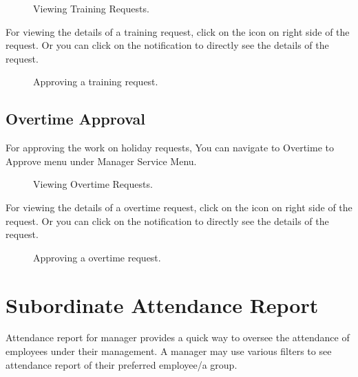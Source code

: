 \documentclass[letterpaper,10pt,english]{sphinxmanual}
\begin{document}
\begin{figure}[htbp]
\centering
\capstart

\noindent{}
\caption{Viewing Training Requests.}\label{\detokenize{manager/manager-approval:id20}}\end{figure}

For viewing the details of a training request, click on the \sphinxstyleemphasis{} icon on right side of the request. Or you can click on the notification to directly see the details of the request.

\begin{figure}[htbp]
\centering
\capstart

\noindent{}
\caption{Approving a training request.}\label{\detokenize{manager/manager-approval:id21}}\end{figure}


\subsection{Overtime Approval}
\label{\detokenize{manager/manager-approval:overtime-approval}}
For approving the work on holiday requests, You can navigate to Overtime to Approve menu under Manager Service Menu.

\begin{figure}[htbp]
\centering
\capstart

\noindent{}
\caption{Viewing Overtime Requests.}\label{\detokenize{manager/manager-approval:id22}}\end{figure}

For viewing the details of a overtime request, click on the \sphinxstyleemphasis{} icon on right side of the request. Or you can click on the notification to directly see the details of the request.

\begin{figure}[htbp]
\centering
\capstart

\noindent{}
\caption{Approving a overtime request.}\label{\detokenize{manager/manager-approval:id23}}\end{figure}


\section{Subordinate Attendance Report}
\label{\detokenize{manager/attendance-report:subordinate-attendance-report}}\label{\detokenize{manager/attendance-report::doc}}
Attendance report for manager provides a quick way to oversee the attendance of employees under their management. A manager may use various filters to see attendance report of their preferred employee/a group.
\end{document}
